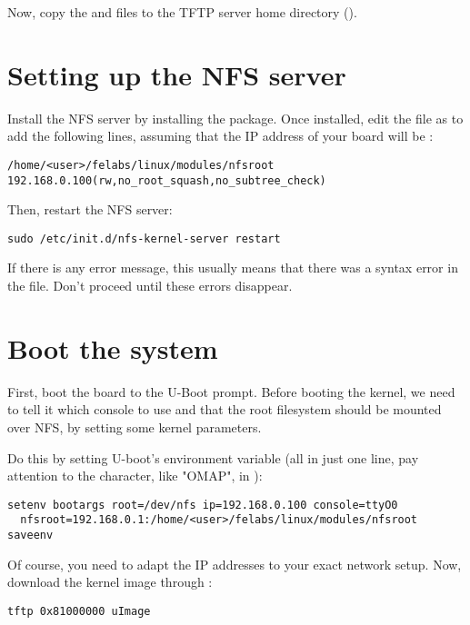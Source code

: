 Now, copy the  and  files
to the TFTP server home directory ().

\section{Setting up the NFS server}

Install the NFS server by installing the 
package. Once installed, edit the  file as
 to add the following lines, assuming that the IP address
of your board will be :

\scriptsize
\begin{verbatim}
/home/<user>/felabs/linux/modules/nfsroot 192.168.0.100(rw,no_root_squash,no_subtree_check)
\end{verbatim}
\normalsize

Then, restart the NFS server:

\begin{verbatim}
sudo /etc/init.d/nfs-kernel-server restart
\end{verbatim}

If there is any error message, this usually means that there was a
syntax error in the  file. Don't proceed until these
errors disappear.

\section{Boot the system}

First, boot the board to the U-Boot prompt. Before booting the kernel,
we need to tell it which console to use and that the root filesystem
should be mounted over NFS, by setting some kernel parameters.

Do this by setting U-boot's  environment variable (all in
just one line, pay attention to the  character, like "OMAP", in
): 

\begin{verbatim}
setenv bootargs root=/dev/nfs ip=192.168.0.100 console=ttyO0
  nfsroot=192.168.0.1:/home/<user>/felabs/linux/modules/nfsroot
saveenv
\end{verbatim}

Of course, you need to adapt the IP addresses to your exact network
setup. Now, download the kernel image through :

\begin{verbatim}
tftp 0x81000000 uImage
\end{verbatim}

